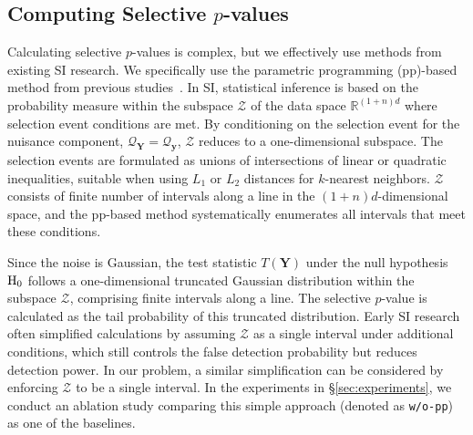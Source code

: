 \subsection{Computing Selective $p$-values}
\label{subsec:computing_selective_p}
%
Calculating selective $p$-values is complex, but we effectively use methods from existing SI research.
%
We specifically use the parametric programming (pp)-based method from previous studies~\citep{sugiyama2020more,le2021parametric,duy2022more}.
%
In SI, statistical inference is based on the probability measure within the subspace $\mathcal{Z}$ of the data space $\mathbb{R}^{(1+n)d}$ where selection event conditions are met.
%
By conditioning on the selection event for the nuisance component, $\mathcal{Q}_{\bm{Y}} = \mathcal{Q}_{\bm{y}}$, $\mathcal{Z}$ reduces to a one-dimensional subspace.
%
The selection events are formulated as unions of intersections of linear or quadratic inequalities, suitable when using $L_1$ or $L_2$ distances for $k$-nearest neighbors.
%
$\mathcal{Z}$ consists of finite number of intervals along a line in the $(1+n)d$-dimensional space, and the pp-based method systematically enumerates all intervals that meet these conditions.

Since the noise is Gaussian, the test statistic $T(\bm{Y})$ under the null hypothesis ${\rm H}_0$ follows a one-dimensional truncated Gaussian distribution within the subspace $\mathcal{Z}$, comprising finite intervals along a line.
%
The selective $p$-value is calculated as the tail probability of this truncated distribution.
%
Early SI research often simplified calculations by assuming $\mathcal{Z}$ as a single interval under additional conditions, which still controls the false detection probability but reduces detection power.
%
In our problem, a similar simplification can be considered by enforcing $\mathcal{Z}$ to be a single interval.
%
In the experiments in \S\ref{sec:experiments}, we conduct an ablation study comparing this simple approach (denoted as {\tt w/o-pp}) as one of the baselines.


